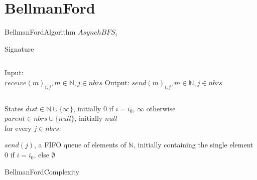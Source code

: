 \documentclass[pdf]{beamer}
\begin{document}
\section{BellmanFord}
\begin{frame}{BellmanFord}{Algorithm}
	$AsynchBFS_i$
	\begin{block}{Signature}
		\begin{columns}
			Input:\\
			\hspace*{\parindent} $receive(m)_{i,j}, m \in \mathbb{N}, j \in nbrs$
			Output:
			\hspace*{\parindent} $send(m)_{i,j}, m \in \mathbb{N}, j \in nbrs$
		\end{columns}
	\end{block}
	\begin{block}{States}
	$dist \in \mathbb{N} \cup \{\infty\}$, initially $0$ if $i=i_0$, $\infty $ otherwise\\
	$parent \in nbrs \cup \{null\}$, initially $null$\\
	for every $j \in nbrs$:\\
	\hspace*{\parindent}
	\parbox{\textwidth}{
	$send(j)$, a FIFO queue of elements of $\mathbb{N}$, initially containing the single element $0$ if $i=i_0$, else $\emptyset$}
	\end{block}
	
\end{frame}
\begin{frame}{BellmanFord}{Complexity}
	
	
\end{frame}
\end{document}
